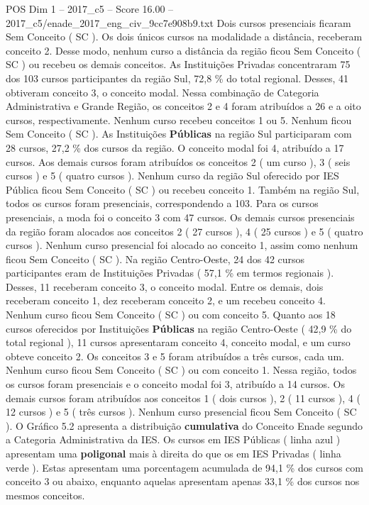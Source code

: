\begin{textsample}{POS Dim 1 – 2017\_c5 – Score 16.00 – 2017\_c5/enade\_2017\_eng\_civ\_9cc7e908b9.txt}
Dois cursos presenciais ficaram Sem Conceito ( SC ).
Os dois únicos cursos na modalidade a distância, receberam conceito 2.
Desse modo, nenhum curso a distância da região ficou Sem Conceito ( SC ) ou recebeu os demais conceitos.
As Instituições Privadas concentraram 75 dos 103 cursos participantes da região Sul, 72,8 \% do total regional.
Desses, 41 obtiveram conceito 3, o conceito modal.
Nessa combinação de Categoria Administrativa e Grande Região, os conceitos 2 e 4 foram atribuídos a 26 e a oito cursos, respectivamente.
Nenhum curso recebeu conceitos 1 ou 5.
Nenhum ficou Sem Conceito ( SC ).
As Instituições \textbf{Públicas} na região Sul participaram com 28 cursos, 27,2 \% dos cursos da região.
O conceito modal foi 4, atribuído a 17 cursos.
Aos demais cursos foram atribuídos os conceitos 2 ( um curso ), 3 ( seis cursos ) e 5 ( quatro cursos ).
Nenhum curso da região Sul oferecido por IES Pública ficou Sem Conceito ( SC ) ou recebeu conceito 1.
Também na região Sul, todos os cursos foram presenciais, correspondendo a 103.
Para os cursos presenciais, a moda foi o conceito 3 com 47 cursos.
Os demais cursos presenciais da região foram alocados aos conceitos 2 ( 27 cursos ), 4 ( 25 cursos ) e 5 ( quatro cursos ).
Nenhum curso presencial foi alocado ao conceito 1, assim como nenhum ficou Sem Conceito ( SC ).
Na região Centro-Oeste, 24 dos 42 cursos participantes eram de Instituições Privadas ( 57,1 \% em termos regionais ).
Desses, 11 receberam conceito 3, o conceito modal.
Entre os demais, dois receberam conceito 1, dez receberam conceito 2, e um recebeu conceito 4.
Nenhum curso ficou Sem Conceito ( SC ) ou com conceito 5.
Quanto aos 18 cursos oferecidos por Instituições \textbf{Públicas} na região Centro-Oeste ( 42,9 \% do total regional ), 11 cursos apresentaram conceito 4, conceito modal, e um curso obteve conceito 2.
Os conceitos 3 e 5 foram atribuídos a três cursos, cada um.
Nenhum curso ficou Sem Conceito ( SC ) ou com conceito 1.
Nessa região, todos os cursos foram presenciais e o conceito modal foi 3, atribuído a 14 cursos.
Os demais cursos foram atribuídos aos conceitos 1 ( dois cursos ), 2 ( 11 cursos ), 4 ( 12 cursos ) e 5 ( três cursos ).
Nenhum curso presencial ficou Sem Conceito ( SC ).
O Gráfico 5.2 apresenta a distribuição \textbf{cumulativa} do Conceito Enade segundo a Categoria Administrativa da IES.
Os cursos em IES Públicas ( linha azul ) apresentam uma \textbf{poligonal} mais à direita do que os em IES Privadas ( linha verde ).
Estas apresentam uma porcentagem acumulada de 94,1 \% dos cursos com conceito 3 ou abaixo, enquanto aquelas apresentam apenas 33,1 \% dos cursos nos mesmos conceitos.

\end{textsample}

